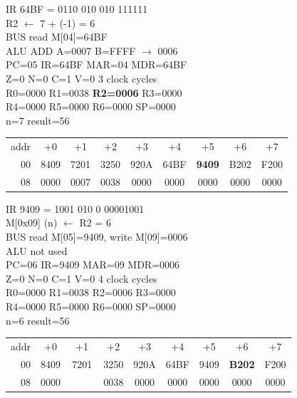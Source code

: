 \noindent\begin{tcolorbox}[stepbox, title={Step 10 \hfill PC 04 \quad ADDI R2, R2, -1}]
\textcolor{dim}{IR} 64BF = 0110 010 010 111111\\
R2 $\leftarrow$ 7 + (-1) = 6\\
\textcolor{dim}{BUS} read M[04]=64BF\\
\textcolor{dim}{ALU} ADD A=0007 B=FFFF $\rightarrow$ 0006\\
PC=05 IR=64BF MAR=04 MDR=64BF\\
Z=0 N=0 C=1 V=0 \hfill \textcolor{dim}{3 clock cycles}\\
R0=0000 R1=0038 \textcolor{wrt}{\textbf{R2=0006}} R3=0000\\
R4=0000 R5=0000 R6=0000 SP=0000\\
\textcolor{dim}{n=7  result=56}\\[1pt]
{\setlength{\tabcolsep}{1.6pt}\begin{tabular}{@{}r*{8}{c}@{}}
\textcolor{dim}{addr} & \textcolor{dim}{+0} & \textcolor{dim}{+1} & \textcolor{dim}{+2} & \textcolor{dim}{+3} & \textcolor{dim}{+4} & \textcolor{dim}{+5} & \textcolor{dim}{+6} & \textcolor{dim}{+7}\\
\textcolor{dim}{00} & 8409 & 7201 & 3250 & 920A & 64BF & \cellcolor{pcc}\textbf{9409} & B202 & F200\\
\textcolor{dim}{08} & 0000 & \cellcolor{datac}0007 & \cellcolor{datac}0038 & 0000 & 0000 & 0000 & 0000 & 0000\\
\end{tabular}}
\end{tcolorbox}\hfill\begin{tcolorbox}[stepbox, title={Step 11 \hfill PC 05 \quad ST R2, n}]
\textcolor{dim}{IR} 9409 = 1001 010 0 00001001\\
M[0x09] (n) $\leftarrow$ R2 = 6\\
\textcolor{dim}{BUS} read M[05]=9409, \textcolor{wrt}{write M[09]=0006}\\
\textcolor{dim}{ALU} \textcolor{dim}{not used}\\
PC=06 IR=9409 MAR=09 MDR=0006\\
Z=0 N=0 C=1 V=0 \hfill \textcolor{dim}{4 clock cycles}\\
R0=0000 R1=0038 R2=0006 R3=0000\\
R4=0000 R5=0000 R6=0000 SP=0000\\
\textcolor{dim}{n=6  result=56}\\[1pt]
{\setlength{\tabcolsep}{1.6pt}\begin{tabular}{@{}r*{8}{c}@{}}
\textcolor{dim}{addr} & \textcolor{dim}{+0} & \textcolor{dim}{+1} & \textcolor{dim}{+2} & \textcolor{dim}{+3} & \textcolor{dim}{+4} & \textcolor{dim}{+5} & \textcolor{dim}{+6} & \textcolor{dim}{+7}\\
\textcolor{dim}{00} & 8409 & 7201 & 3250 & 920A & 64BF & 9409 & \cellcolor{pcc}\textbf{B202} & F200\\
\textcolor{dim}{08} & 0000 & \cellcolor{wrt}\textcolor{white}{\textbf{0006}} & \cellcolor{datac}0038 & 0000 & 0000 & 0000 & 0000 & 0000\\
\end{tabular}}
\end{tcolorbox}\par\vspace{3pt}
